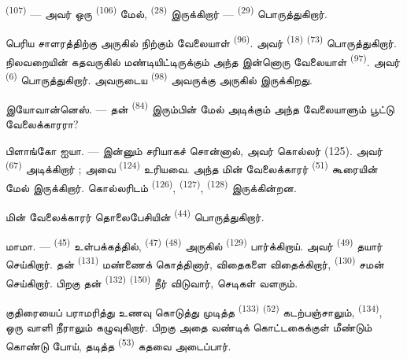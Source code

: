  \textsuperscript{(107)} — அவர் ஒரு
 \textsuperscript{(106)} மேல், 
\textsuperscript{(28)} இருக்கிறார் — 
\textsuperscript{(29)} பொருத்துகிறார்.

பெரிய சாளரத்திற்கு அருகில் நிற்கும் வேலையாள்  \textsuperscript{(96)}. அவர் 
\textsuperscript{(18)}  \textsuperscript{(73)}
பொருத்துகிறார். நிலவறையின் கதவருகில் மண்டியிட்டிருக்கும் அந்த இன்னொரு
வேலையாள்  \textsuperscript{(97)}. அவர்
 \textsuperscript{(6)} பொருத்துகிறார். அவருடைய
 \textsuperscript{(98)} அவருக்கு அருகில் இருக்கிறது.

\textsc{இயோவான்னெஸ்}. --- தன்  \textsuperscript{(84)}
இரும்பின் மேல் அடிக்கும் அந்த வேலையாளும் பூட்டு வேலைக்காரரா?

\textsc{பிளாங்கோ ஐயா}. --- இன்னும் சரியாகச் சொன்னால், அவர் கொல்லர் (125).
அவர்  \textsuperscript{(67)} அடிக்கிறார் ; அவை
 \textsuperscript{(124)} உரியவை. அந்த மின்
வேலைக்காரர்  \textsuperscript{(51)} கூரையின்
மேல் இருக்கிறார். கொல்லரிடம்  \textsuperscript{(126)},
 \textsuperscript{(127)}, 
\textsuperscript{(128)} இருக்கின்றன.

மின் வேலைக்காரர் தொலைபேசியின்  \textsuperscript{(44)}
 பொருத்துகிறார்.

\VUsaut{3.0mm}

\textsc{மாமா}. ---  \textsuperscript{(45)} உள்பக்கத்தில்,
 \textsuperscript{(47)} 
\textsuperscript{(48)} அருகில்  \textsuperscript{(129)}
பார்க்கிறாய். அவர்  \textsuperscript{(49)} தயார்
செய்கிறார். தன்  \textsuperscript{(131)} மண்ணைக்
கொத்தினார், விதைகளை விதைக்கிறார், 
\textsuperscript{(130)} சமன் செய்கிறார். பிறகு தன்  \textsuperscript{(132)} 
\textsuperscript{(150)} நீர் விடுவார், செடிகள் வளரும்.

குதிரையைப் பராமரித்து உணவு கொடுத்து முடித்த 
\textsuperscript{(133)}  \textsuperscript{(52)}
கடற்பஞ்சாலும்,  \textsuperscript{(134)}, ஒரு வாளி
நீராலும் கழுவுகிறார். பிறகு அதை வண்டிக் கொட்டகைக்குள் மீண்டும்
கொண்டு போய், தடித்த  \textsuperscript{(53)} கதவை
அடைப்பார்.

